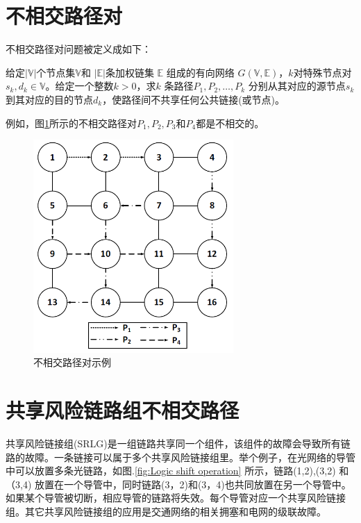 \section{不相交路径对}
不相交路径对问题被定义成如下：

\begin{definition}[不相交路径对]
给定$|\mathbb{V}|$个节点集$\mathbb{V}$和 $|\mathbb{E}|$条加权链集 $\mathbb{E}$ 组成的有向网络 $G(\mathbb{V},\mathbb{E})$，$k$对特殊节点对$s_k,d_k\in\mathbb{V}$。给定一个整数$k>0$，求$k$ 条路径$P_1,P_2,\ldots,P_k$ 分别从其对应的源节点$s_k$到其对应的目的节点$d_k$，使路径间不共享任何公共链接(或节点)。
\end{definition}
例如，图\ref{fig:DisjointPathPairs}所示的不相交路径对$P_1,P_2,P_3$和$P_4$都是不相交的。
\begin{figure}[htbp]
  \centering
  \includegraphics[width=3.0in]{figures/DisjointPathPairs}
  \caption{不相交路径对示例}
  \label{fig:DisjointPathPairs}
\end{figure}
\section{共享风险链路组不相交路径}

共享风险链接组(SRLG)是一组链路共享同一个组件，该组件的故障会导致所有链路的故障。一条链接可以属于多个共享风险链接组里。举个例子，在光网络的导管中\cite{bhandari1994optimal}可以放置多条光链路，如图.\ref{fig:Logic shift operation} 所示，链路(1,2),(3,2) 和（3,4) 放置在一个导管中，同时链路(3，2)和(3，4)也共同放置在另一个导管中。如果某个导管被切断，相应导管的链路将失效。每个导管对应一个共享风险链接组。其它共享风险链接组的应用是交通网络的相关拥塞和电网的级联故障\cite{coudert2007shared}。


